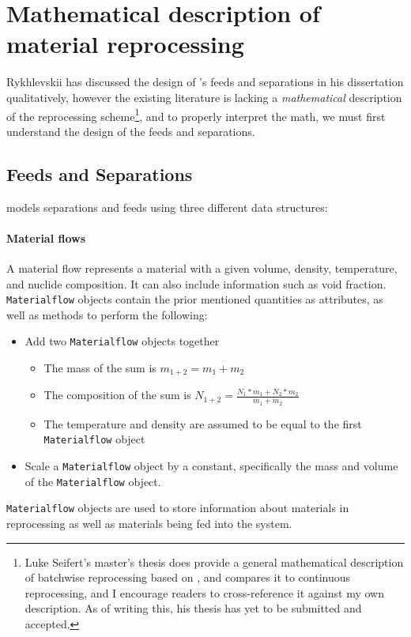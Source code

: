 \section{Mathematical description of material reprocessing}
Rykhlevskii has discussed the design of \SaltProc's feeds and separations in
his dissertation qualitatively, however the existing \SaltProc literature is lacking a {\it mathematical} description of the reprocessing scheme\footnote{Luke Seifert's master's thesis does provide a general
mathematical description of batchwise reprocessing based on \SaltProc, and
compares it to continuous reprocessing, and I encourage readers to
cross-reference it against my own description. As of writing this, his thesis
has yet to be submitted and accepted.}, and to properly interpret the math, we
must first understand the design of the feeds and separations.

\subsection{Feeds and Separations}
\label{sub:feeds-separations}
\SaltProc models separations and feeds using three different data structures:

\paragraph{Material flows}
    A material flow represents a material with a given
    volume, density, temperature, and nuclide composition.
    It can also include information such as void fraction. \verb.Materialflow.
    objects contain the prior mentioned quantities as attributes, as well as
    methods to perform the following:
    \begin{itemize}
        \item Add two \verb.Materialflow. objects together
            \begin{itemize}
                \item The mass of the sum is $m_{1+2} = m_{1} + m_{2}$
                \item The composition of the sum is $N_{1+2} = \frac{N_{1} * m_{1} + N_{2} * m_{2}}{m_{1} + m_{2}}$
                \item The temperature and density are assumed to be equal to the
                    first \verb.Materialflow. object
            \end{itemize}
        \item Scale a \verb.Materialflow. object by a constant, specifically
            the mass and volume of the \verb.Materialflow. object.
    \end{itemize}
    \verb.Materialflow. objects are used to store information about materials
    in reprocessing as well as materials being fed into the system.

